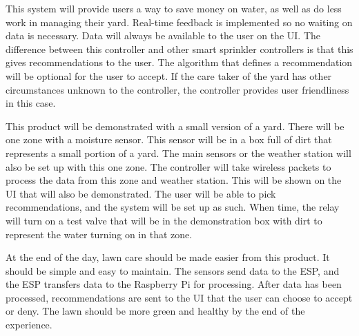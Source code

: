 \documentclass[letterpaper, 10 pt, conference]{ieeeconf}  %
\begin{document}
This system will provide users a way to save money on water, as well as do less work in managing their yard. Real-time feedback is implemented so no waiting on data is necessary. Data will always be available to the user on the UI. The difference between this controller and other smart sprinkler controllers is that this gives recommendations to the user. The algorithm that defines a recommendation will be optional for the user to accept. If the care taker of the yard has other circumstances unknown to the controller, the controller provides user friendliness in this case. 

This product will be demonstrated with a small version of a yard. There will be one zone with a moisture sensor. This sensor will be in a box full of dirt that represents a small portion of a yard. The main sensors or the weather station will also be set up with this one zone. The controller will take wireless packets to process the data from this zone and weather station. This will be shown on the UI that will also be demonstrated. The user will be able to pick recommendations, and the system will be set up as such. When time, the relay will turn on a test valve that will be in the demonstration box with dirt to represent the water turning on in that zone.

At the end of the day, lawn care should be made easier from this product. It should be simple and easy to maintain. The sensors send data to the ESP, and the ESP transfers data to the Raspberry Pi for processing. After data has been processed, recommendations are sent to the UI that the user can choose to accept or deny. The lawn should be more green and healthy by the end of the experience. 





\end{document}
